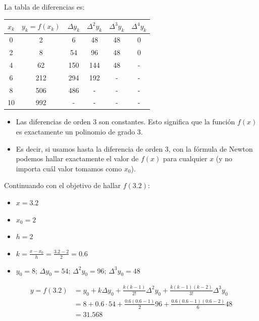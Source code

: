 \documentclass[openany]{book}
\providecommand{\tightlist}{%
  \setlength{\itemsep}{0pt}\setlength{\parskip}{0pt}}
\begin{document}
La tabla de diferencias es:

\begin{longtable}[]{@{}cccccc@{}}
\toprule
\(x_k\) & \(y_k=f(x_k)\) & \(\Delta y_k\) & \(\Delta^2 y_k\) & \(\Delta^3 y_k\) & \(\Delta^4 y_k\)\tabularnewline
\midrule
\endhead
0 & 2 & 6 & 48 & 48 & 0\tabularnewline
2 & 8 & 54 & 96 & 48 & 0\tabularnewline
4 & 62 & 150 & 144 & 48 & -\tabularnewline
6 & 212 & 294 & 192 & - & -\tabularnewline
8 & 506 & 486 & - & - & -\tabularnewline
10 & 992 & - & - & - & -\tabularnewline
\bottomrule
\end{longtable}

\begin{itemize}
\tightlist
\item
  Las diferencias de orden 3 son constantes. Esto significa que la función \(f(x)\) es exactamente un polinomio de grado 3.
\item
  Es decir, si usamos hasta la diferencia de orden 3, con la fórmula de Newton podemos hallar exactamente el valor de \(f(x)\) para cualquier \(x\) (y no importa cuál valor tomamos como \(x_0\)).
\end{itemize}

Continuando con el objetivo de hallar \(f(3.2)\):

\begin{itemize}
\tightlist
\item
  \(x = 3.2\)
\item
  \(x_0 = 2\)
\item
  \(h = 2\)
\item
  \(k = \frac{x-x_0}{h} = \frac{3.2-2}{2} = 0.6\)
\item
  \(y_0 = 8\); \(\Delta y_0 = 54\); \(\Delta^2 y_0 = 96\); \(\Delta^3 y_0 = 48\)
\end{itemize}

\[
\begin{aligned}
y = f(3.2) &= y_0 + k \Delta y_0 + \frac{k(k-1)}{2!}\Delta^2 y_0 + \frac{k(k-1)(k-2)}{3!}\Delta^3 y_0\\
  & = 8 + 0.6 \cdot 54 + \frac{0.6 (0.6-1)}{2} 96 + \frac{0.6 (0.6-1)(0.6-2)}{6} 48 \\
  & = 31.568
\end{aligned}
\]
\end{document}
